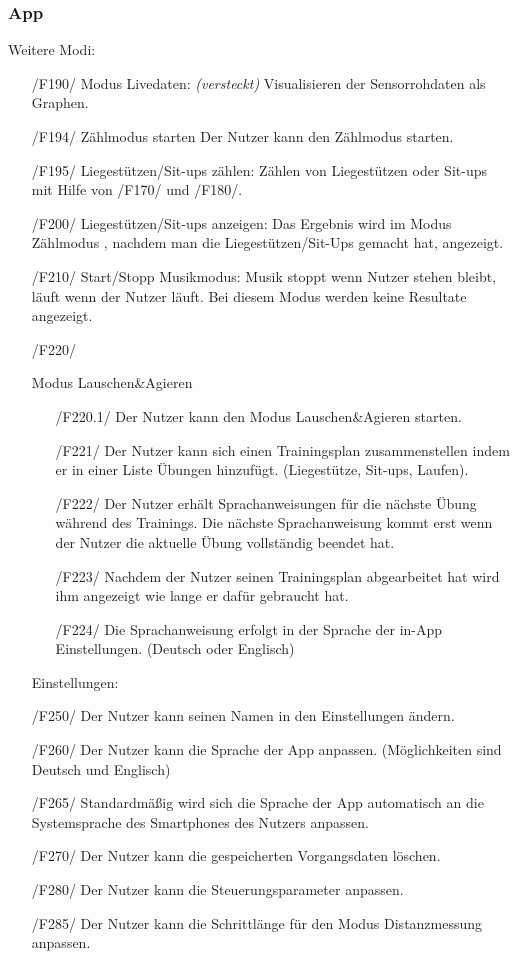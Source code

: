 \documentclass[a4paper,12pt]{article}
\begin{document}
    \subsubsection{App}
      Weitere Modi:
      \begin{itemize}
      \item[/F190/] \textsf{Modus Livedaten: \textit{(versteckt)}} Visualisieren der Sensorrohdaten als Graphen.%
      \item[/F194/] \textsf{Zählmodus starten} Der Nutzer kann den Zählmodus starten.
      \item[/F195/] \textsf{Liegestützen/Sit-ups zählen:} Zählen von Liegestützen oder Sit-ups mit Hilfe von /F170/ und /F180/.
      \item[/F200/] \textsf{Liegestützen/Sit-ups anzeigen:}  Das Ergebnis wird im Modus \glqq{} Zählmodus \grqq{}, nachdem man die Liegestützen/Sit-Ups gemacht hat, angezeigt.
      \item[/F210/] \textsf{Start/Stopp Musikmodus:} Musik stoppt wenn Nutzer stehen bleibt, läuft wenn der Nutzer läuft. Bei diesem Modus werden keine Resultate angezeigt.
      \item[/F220/]{
        Modus \glqq Lauschen\&Agieren\grqq
        \begin{itemize}
          \item[/F220.1/] Der Nutzer kann den Modus Lauschen\&Agieren starten.
          \item[/F221/]Der Nutzer kann sich einen Trainingsplan zusammenstellen indem er in einer Liste Übungen hinzufügt. (Liegestütze, Sit-ups, Laufen). 
          \item[/F222/] Der Nutzer erhält Sprachanweisungen für die nächste Übung während des Trainings. Die nächste Sprachanweisung kommt erst wenn der Nutzer die aktuelle Übung vollständig beendet hat.
          \item[/F223/] Nachdem der Nutzer seinen Trainingsplan abgearbeitet hat wird ihm angezeigt wie lange er dafür gebraucht hat.
          \item[/F224/] Die Sprachanweisung erfolgt in der Sprache der in-App Einstellungen. (Deutsch oder Englisch)
        \end{itemize}
      }

      Einstellungen:
      \item[/F250/] Der Nutzer kann seinen Namen in den Einstellungen ändern.
      \item[/F260/] Der Nutzer kann die Sprache der App anpassen. (Möglichkeiten sind Deutsch und Englisch)
      \item[/F265/] Standardmäßig wird sich die Sprache der App automatisch an die Systemsprache des Smartphones des Nutzers anpassen.
      \item[/F270/] Der Nutzer kann die gespeicherten \Gls{Vorgangsdaten} löschen.
      \item[/F280/] Der Nutzer kann die \Gls{Steuerungsparameter} anpassen. 
      \item[/F285/] Der Nutzer kann die Schrittlänge für den Modus Distanzmessung anpassen.
      

\end{itemize}
\end{document}
